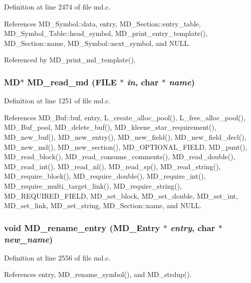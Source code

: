 Definition at line 2474 of file md.c.

References MD\_\-Symbol::data, entry, MD\_\-Section::entry\_\-table, MD\_\-Symbol\_\-Table::head\_\-symbol, MD\_\-print\_\-entry\_\-template(), MD\_\-Section::name, MD\_\-Symbol::next\_\-symbol, and NULL.

Referenced by MD\_\-print\_\-md\_\-template().
\subsubsection{\setlength{\rightskip}{0pt plus 5cm}\bf{MD}$\ast$ MD\_\-read\_\-md (FILE $\ast$ {\em in}, char $\ast$ {\em name})}\label{md_8h_0574c5322b5fd565ffc5adfc2e6e8614}




Definition at line 1251 of file md.c.

References MD\_\-Buf::buf, entry, L\_\-create\_\-alloc\_\-pool(), L\_\-free\_\-alloc\_\-pool(), MD\_\-Buf\_\-pool, MD\_\-delete\_\-buf(), MD\_\-kleene\_\-star\_\-requirement(), MD\_\-new\_\-buf(), MD\_\-new\_\-entry(), MD\_\-new\_\-field(), MD\_\-new\_\-field\_\-decl(), MD\_\-new\_\-md(), MD\_\-new\_\-section(), MD\_\-OPTIONAL\_\-FIELD, MD\_\-punt(), MD\_\-read\_\-block(), MD\_\-read\_\-consume\_\-comments(), MD\_\-read\_\-double(), MD\_\-read\_\-int(), MD\_\-read\_\-nl(), MD\_\-read\_\-sp(), MD\_\-read\_\-string(), MD\_\-require\_\-block(), MD\_\-require\_\-double(), MD\_\-require\_\-int(), MD\_\-require\_\-multi\_\-target\_\-link(), MD\_\-require\_\-string(), MD\_\-REQUIRED\_\-FIELD, MD\_\-set\_\-block, MD\_\-set\_\-double, MD\_\-set\_\-int, MD\_\-set\_\-link, MD\_\-set\_\-string, MD\_\-Section::name, and NULL.
\subsubsection{\setlength{\rightskip}{0pt plus 5cm}void MD\_\-rename\_\-entry (\bf{MD\_\-Entry} $\ast$ {\em entry}, char $\ast$ {\em new\_\-name})}\label{md_8h_21f5e11ef45622d57325c409ba6a486c}




Definition at line 2556 of file md.c.

References entry, MD\_\-rename\_\-symbol(), and MD\_\-strdup().
